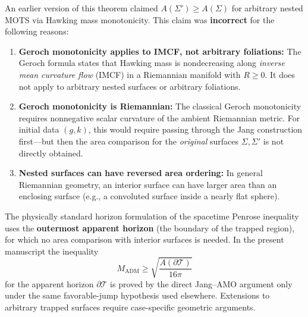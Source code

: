 \begin{remark}\label{rem:AreaComparisonClarification}
An earlier version of this theorem claimed $A(\Sigma') \ge A(\Sigma)$ for arbitrary nested MOTS via Hawking mass monotonicity. This claim was \textbf{incorrect} for the following reasons:
\begin{enumerate}
    \item \textbf{Geroch monotonicity applies to IMCF, not arbitrary foliations:} The Geroch formula states that Hawking mass is nondecreasing along \emph{inverse mean curvature flow} (IMCF) in a Riemannian manifold with $R \ge 0$. It does not apply to arbitrary nested surfaces or arbitrary foliations.
    \item \textbf{Geroch monotonicity is Riemannian:} The classical Geroch monotonicity requires nonnegative scalar curvature of the ambient Riemannian metric. For initial data $(g,k)$, this would require passing through the Jang construction first---but then the area comparison for the \emph{original} surfaces $\Sigma, \Sigma'$ is not directly obtained.
    \item \textbf{Nested surfaces can have reversed area ordering:} In general Riemannian geometry, an interior surface can have larger area than an enclosing surface (e.g., a convoluted surface inside a nearly flat sphere).
\end{enumerate}

The physically standard horizon formulation of the spacetime Penrose inequality uses the \textbf{outermost apparent horizon} (the boundary of the trapped region), for which no area comparison with interior surfaces is needed. In the present manuscript the inequality
\[
    M_{\mathrm{ADM}} \ge \sqrt{\frac{A(\partial\mathcal{T})}{16\pi}}
\]
for the apparent horizon $\partial\mathcal{T}$ is proved by the direct Jang--AMO argument only under the same favorable-jump hypothesis used elsewhere. Extensions to arbitrary trapped surfaces require case-specific geometric arguments.
\end{remark}


